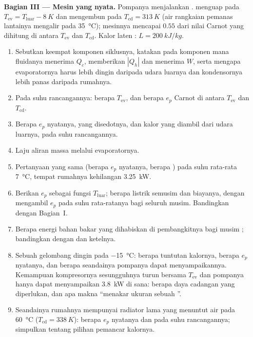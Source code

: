 \begin{problem}
\medskip
\noindent\textbf{Bagian III --- Mesin yang nyata.}
Pompanya menjalankan .  menguap pada
$T_{\mathrm{ev}} = T_{\mathrm{luar}} - \qty{8}{K}$ dan mengembun pada
$T_{\mathrm{cd}} = \qty{313}{K}$ (air rangkaian pemanas lantainya mengalir pada
\qty{35}{\degreeCelsius}); mesinnya mencapai $0.55$ dari nilai Carnot
yang dihitung di antara $T_{\mathrm{ev}}$ dan $T_{\mathrm{cd}}$. Kalor laten
: $L = \qty{200}{kJ/kg}$.
\begin{enumerate}[resume]
  \item Sebutkan keempat komponen siklusnya, katakan pada komponen mana fluidanya
        menerima $Q_c$, memberikan $|Q_h|$ dan menerima $W$, serta mengapa
        evaporatornya harus lebih dingin daripada udara luarnya dan
        kondensornya lebih panas daripada rumahnya.
  \item Pada suhu rancangannya: berapa $T_{\mathrm{ev}}$, dan berapa $e_p$ Carnot
        di antara $T_{\mathrm{ev}}$ dan $T_{\mathrm{cd}}$.
  \item Berapa $e_p$ nyatanya,  yang disedotnya, dan kalor yang diambil dari
        udara luarnya, pada suhu rancangannya.
  \item Laju aliran massa  melalui evaporatornya.
  \item Pertanyaan yang sama (berapa $e_p$ nyatanya, berapa ) pada suhu
        rata-rata \qty{7}{\degreeCelsius}, tempat rumahnya kehilangan
        \qty{3.25}{kW}.
  \item Berikan $e_p$ sebagai fungsi $T_{\mathrm{luar}}$; berapa listrik semusim
        dan biayanya, dengan mengambil $e_p$ pada suhu rata-ratanya bagi seluruh musim.
        Bandingkan dengan Bagian~I.
  \item Berapa energi bahan bakar yang dihabiskan di pembangkitnya bagi musim ; bandingkan dengan  dan ketelnya.
  \item Sebuah gelombang dingin pada \qty{-15}{\degreeCelsius}: berapa tuntutan kalornya, berapa $e_p$ nyatanya,
        dan berapa  seandainya pompanya dapat menyampaikannya. Kemampuan kompresornya
        sesungguhnya turun bersama $T_{\mathrm{ev}}$ dan pompanya hanya dapat
        menyampaikan \qty{3.8}{kW} di sana: berapa daya  cadangan yang diperlukan, dan
        apa makna ``menakar ukuran sebuah ''.
  \item Seandainya rumahnya mempunyai radiator lama yang menuntut air pada
        \qty{60}{\degreeCelsius} ($T_{\mathrm{cd}} = \qty{338}{K}$): berapa $e_p$ nyatanya
        dan  pada suhu rancangannya; simpulkan tentang
        pilihan pemancar kalornya.
\end{enumerate}


\end{problem}
